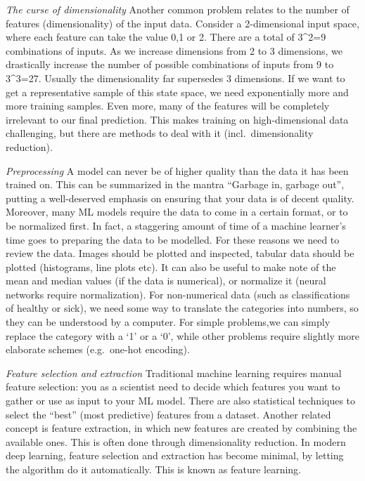 \documentclass[
]{book}
\begin{document}
\emph{The curse of dimensionality}
Another common problem relates to the number of features (dimensionality) of the input data. Consider a 2-dimensional input space, where each feature can take the value 0,1 or 2. There are a total of 3\^{}2=9 combinations of inputs. As we increase dimensions from 2 to 3 dimensions, we drastically increase the number of possible combinations of inputs from 9 to 3\^{}3=27. Usually the dimensionality far supersedes 3 dimensions. If we want to get a representative sample of this state space, we need exponentially more and more training samples. Even more, many of the features will be completely irrelevant to our final prediction. This makes training on high-dimensional data challenging, but there are methods to deal with it (incl.~dimensionality reduction).

\emph{Preprocessing}
A model can never be of higher quality than the data it has been trained on. This can be summarized in the mantra ``Garbage in, garbage out'', putting a well-deserved emphasis on ensuring that your data is of decent quality. Moreover, many ML models require the data to come in a certain format, or to be normalized first. In fact, a staggering amount of time of a machine learner's time goes to preparing the data to be modelled. For these reasons we need to review the data. Images should be plotted and inspected, tabular data should be plotted (histograms, line plots etc). It can also be useful to make note of the mean and median values (if the data is numerical), or normalize it (neural networks require normalization). For non-numerical data (such as classifications of healthy or sick), we need some way to translate the categories into numbers, so they can be understood by a computer. For simple problems,we can simply replace the category with a `1' or a `0', while other problems require slightly more elaborate schemes (e.g.~one-hot encoding).

\emph{Feature selection and extraction}
Traditional machine learning requires manual feature selection: you as a scientist need to decide which features you want to gather or use as input to your ML model. There are also statistical techniques to select the ``best'' (most predictive) features from a dataset. Another related concept is feature extraction, in which new features are created by combining the available ones. This is often done through dimensionality reduction. In modern deep learning, feature selection and extraction has become minimal, by letting the algorithm do it automatically. This is known as feature learning.
\end{document}
